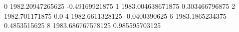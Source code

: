 0 1982.20947265625 -0.49169921875
1 1983.004638671875 0.303466796875
2 1982.701171875 0.0
4 1982.6611328125 -0.0400390625
6 1983.1865234375 0.4853515625
8 1983.686767578125 0.985595703125
